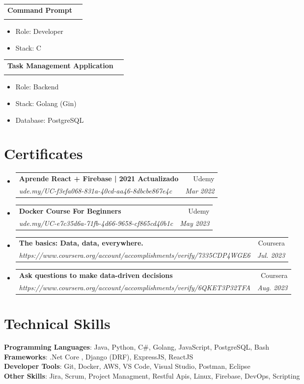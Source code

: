 \documentclass[letterpaper,11pt]{article}
\makeatletter
\newcommand{\resumeItem}[1]{
  \item\small{
    {#1 \vspace{-2pt}}
  }
}
\newcommand{\resumeSubheading}[4]{
  \vspace{-2pt}\item
    \begin{tabular*}{0.97\textwidth}[t]{l@{\extracolsep{\fill}}r}
      \textbf{#1} & #2 \\
      \textit{\small#3} & \textit{\small #4} \\
    \end{tabular*}\vspace{-7pt}
}
\newcommand{\resumeSubHeadingListStart}{\begin{itemize}[leftmargin=0.15in, label={}]}
\newcommand{\resumeSubHeadingListEnd}{\end{itemize}}
\newcommand{\resumeItemListStart}{\begin{itemize}}
\newcommand{\resumeItemListEnd}{\end{itemize}\vspace{-5pt}}
\makeatother
\begin{document}
\resumeSubheading
    {Command Prompt}{}
    {}{}
\resumeItemListStart
    \resumeItem{Role: Developer}
    \resumeItem{Stack: C}
\resumeItemListEnd

\resumeSubheading
    {Task Management Application}{}
    {}{}
\resumeItemListStart
    \resumeItem{Role: Backend}
    \resumeItem{Stack: Golang (Gin)}
    \resumeItem{Database: PostgreSQL}
\resumeItemListEnd



\section{Certificates}



  \resumeSubHeadingListStart
    \resumeSubheading
      {Aprende React + Firebase | 2021 Actualizado
}{Udemy}
      {ude.my/UC-f3efa068-831a-40cd-aa46-8dbcbe867e4c}{Mar 2022}
  \resumeSubHeadingListEnd

  \resumeSubHeadingListStart
    \resumeSubheading
      {Docker Course For Beginners}{Udemy}
      {ude.my/UC-e7c35d6a-71fb-4d66-9658-cf865cd40b1c}{May 2023}
  \resumeSubHeadingListEnd

  \resumeSubHeadingListStart
    \resumeSubheading
      {The basics: Data, data, everywhere.}{Coursera}
      {https://www.coursera.org/account/accomplishments/verify/7335CDP4WGE6}{Jul. 2023}
  \resumeSubHeadingListEnd

  \resumeSubHeadingListStart
    \resumeSubheading
      {Ask questions to make data-driven decisions}{Coursera}
      {https://www.coursera.org/account/accomplishments/verify/6QKET3P32TFA}{Aug. 2023}
  \resumeSubHeadingListEnd


%

\section{Technical Skills}
 \begin{itemize}[leftmargin=0.15in, label={}]
    \small{\item{
     \textbf{Programming Languages}{: Java, Python, C\#, Golang, JavaScript, PostgreSQL, Bash} \\
     \textbf{Frameworks}{: .Net Core , Django (DRF), ExpressJS, ReactJS} \\
     \textbf{Developer Tools}{: Git, Docker, AWS, VS Code, Visual Studio, Postman, Eclipse} \\
     \textbf{Other Skills}{: Jira, Scrum, Project Managment, Restful Apis, Linux, Firebase, DevOps, Scripting}
    }}
 \end{itemize}
\end{document}
